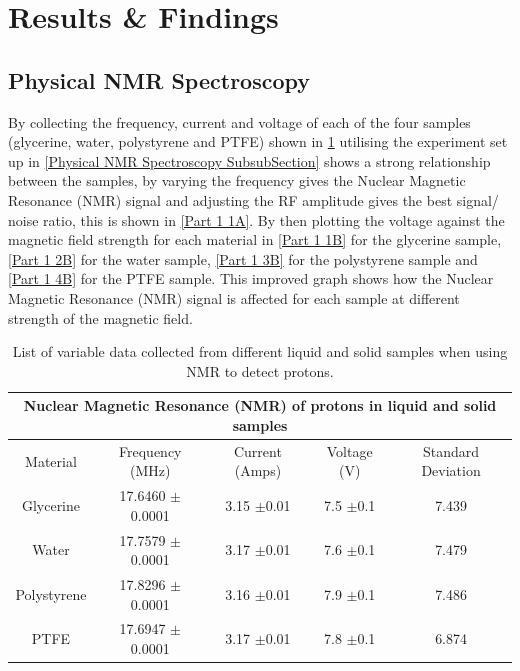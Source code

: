 \documentclass[12pt]{article}
\begin{document}
\section{Results \& Findings}
\label{Results & Findings Section}

\subsection{Physical NMR Spectroscopy}
\label{Physical NMR Spectroscopy SubSection}

By collecting the frequency, current and voltage of each of the four samples (glycerine, water, polystyrene and PTFE) shown in \cref{Phy NMR Spec} utilising the experiment set up in \cref{Physical NMR Spectroscopy SubsubSection} shows a strong relationship between the samples, by varying the frequency gives the Nuclear Magnetic Resonance (NMR) signal and adjusting the RF amplitude gives the best signal/ noise ratio, this is shown in \cref{Part 1 1A}. By then plotting the voltage against the magnetic field strength for each material in \cref{Part 1 1B} for the glycerine sample, \cref{Part 1 2B} for the water sample, \cref{Part 1 3B} for the polystyrene sample and \cref{Part 1 4B} for the PTFE sample. This improved graph shows how the Nuclear Magnetic Resonance (NMR) signal is affected for each sample at different strength of the magnetic field.

\begin{table}[H]
\begin{center}
 \footnotesize
 \begin{tabular}{|c||c||c||c||c|}
 \hline
 \multicolumn{5}{|c|}{Nuclear Magnetic Resonance (NMR) of protons in liquid and solid samples} \\
 \hline
 Material & Frequency (MHz)  & Current (Amps)  & Voltage (V) & Standard Deviation \\
 \hline \hline
 Glycerine & 17.6460 $\pm$0.0001  & 3.15 $\pm$0.01  & 7.5 $\pm$0.1 & 7.439\\
 \hline
 Water & 17.7579 $\pm$0.0001  & 3.17 $\pm$0.01  & 7.6 $\pm$0.1 & 7.479\\
 \hline
 Polystyrene & 17.8296 $\pm$0.0001 & 3.16  $\pm$0.01  & 7.9 $\pm$0.1 & 7.486\\
 \hline
 PTFE & 17.6947 $\pm$0.0001  & 3.17 $\pm$0.01  & 7.8  $\pm$0.1 & 6.874\\
 \hline
 \end{tabular} \\ 
 \caption{List of variable data collected from different liquid and solid samples when using NMR to detect protons.}
 \label{Phy NMR Spec}
\end{center}
\end{table}
\end{document}
